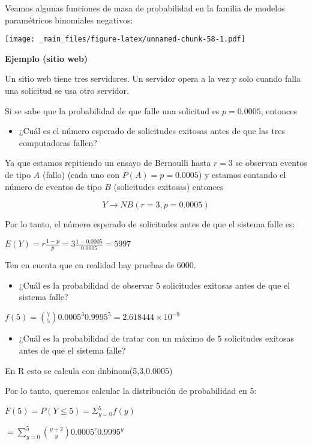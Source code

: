 \documentclass[
]{book}
\providecommand{\tightlist}{%
  \setlength{\itemsep}{0pt}\setlength{\parskip}{0pt}}
\begin{document}
Veamos algunas funciones de masa de probabilidad en la familia de modelos paramétricos binomiales negativos:

\texttt{[image: \_main\_files/figure-latex/unnamed-chunk-58-1.pdf]}

\textbf{Ejemplo (sitio web)}

Un sitio web tiene tres servidores. Un servidor opera a la vez y solo cuando falla una solicitud se usa otro servidor.

Si se sabe que la probabilidad de que falle una solicitud es \(p=0.0005\), entonces

\begin{itemize}
\tightlist
\item
  ¿Cuál es el número esperado de solicitudes exitosas antes de que las tres computadoras fallen?
\end{itemize}

Ya que estamos repitiendo un ensayo de Bernoulli hasta \(r=3\) se observan eventos de tipo \(A\) (fallo) (cada uno con \(P(A)=p=0.0005\)) y estamos contando el número de eventos de tipo \(B\) (solicitudes exitosas) entonces

\[Y \rightarrow NB(r=3, p=0.0005)\]

Por lo tanto, el número esperado de solicitudes antes de que el sistema falle es:

\(E(Y)=r\frac{1-p}{p}=3\frac{1-0.0005}{0.0005}=5997\)

Ten en cuenta que en realidad hay pruebas de \(6000\).

\begin{itemize}
\tightlist
\item
  ¿Cuál es la probabilidad de observar \(5\) solicitudes exitosas antes de que el sistema falle?
\end{itemize}

\(f(5)=\binom {7} 5 0.0005^3 0.9995^5=2.618444 \times 10^{-9}\)

\begin{itemize}
\tightlist
\item
  ¿Cuál es la probabilidad de tratar con un máximo de \(5\) solicitudes exitosas antes de que el sistema falle?
\end{itemize}

En R esto se calcula con dnbinom(5,3,0.0005)

Por lo tanto, queremos calcular la distribución de probabilidad en \(5\):

\(F(5)=P(Y\leq 5)=\Sigma_{y=0}^5 f(y)\)

\(=\sum_{y=0}^5\binom {y+2} y 0.0005^r0.9995^y\)
\end{document}
